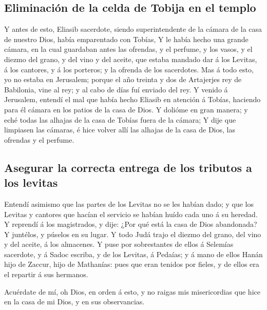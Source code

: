 \hypertarget{eliminaciuxf3n-de-la-celda-de-tobija-en-el-templo}{%
\subsection{Eliminación de la celda de Tobija en el
templo}\label{eliminaciuxf3n-de-la-celda-de-tobija-en-el-templo}}

 Y antes de esto, Eliasib sacerdote, siendo superintendente
de la cámara de la casa de nuestro Dios, había emparentado con Tobías,
 Y le había hecho una grande cámara, en la cual guardaban
antes las ofrendas, y el perfume, y los vasos, y el diezmo del grano, y
del vino y del aceite, que estaba mandado dar á los Levitas, á los
cantores, y á los porteros; y la ofrenda de los sacerdotes. 
Mas á todo esto, yo no estaba en Jerusalem; porque el año treinta y dos
de Artajerjes rey de Babilonia, vine al rey; y al cabo de días fuí
enviado del rey.  Y venido á Jerusalem, entendí el mal que
había hecho Eliasib en atención á Tobías, haciendo para él cámara en los
patios de la casa de Dios.  Y dolióme en gran manera; y eché
todas las alhajas de la casa de Tobías fuera de la cámara; 
Y dije que limpiasen las cámaras, é hice volver allí las alhajas de la
casa de Dios, las ofrendas y el perfume.

\hypertarget{asegurar-la-correcta-entrega-de-los-tributos-a-los-levitas}{%
\subsection{Asegurar la correcta entrega de los tributos a los
levitas}\label{asegurar-la-correcta-entrega-de-los-tributos-a-los-levitas}}

 Entendí asimismo que las partes de los Levitas no se les
habían dado; y que los Levitas y cantores que hacían el servicio se
habían huído cada uno á su heredad.  Y reprendí á los
magistrados, y dije: ¿Por qué está la casa de Dios abandonada? Y
juntélos, y púselos en su lugar.  Y todo Judá trajo el
diezmo del grano, del vino y del aceite, á los almacenes. 
Y puse por sobrestantes de ellos á Selemías sacerdote, y á Sadoc
escriba, y de los Levitas, á Pedaías; y á mano de ellos Hanán hijo de
Zaccur, hijo de Mathanías: pues que eran tenidos por fieles, y de ellos
era el repartir á sus hermanos.

 Acuérdate de mí, oh Dios, en orden á esto, y no raigas mis
misericordias que hice en la casa de mi Dios, y en sus observancias.

